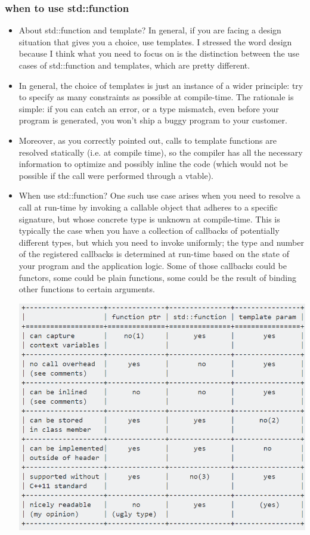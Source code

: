 \documentclass[a4paper,11pt,twoside]{book}
\begin{document}
\subsubsection{when to use std::function}
\begin{itemize}
	\item About std::function and template? In general, if you are facing a design situation that gives you a choice, use templates. I stressed the word design because I think what you need to focus on is the distinction between the use cases of std::function and templates, which are pretty different.
	
	\item In general, the choice of templates is just an instance of a wider principle: try to specify as many constraints as possible at compile-time. The rationale is simple: if you can catch an error, or a type mismatch, even before your program is generated, you won't ship a buggy program to your customer.
	
	\item Moreover, as you correctly pointed out, calls to template functions are resolved statically (i.e. at compile time), so the compiler has all the necessary information to optimize and possibly inline the code (which would not be possible if the call were performed through a vtable).
	
	
	\item When use std::function? One such use case arises when you need to resolve a call at run-time by invoking a callable object that adheres to a specific signature, but whose concrete type is unknown at compile-time. This is typically the case when you have a collection of callbacks of potentially different types, but which you need to invoke uniformly; the type and number of the registered callbacks is determined at run-time based on the state of your program and the application logic. Some of those callbacks could be functors, some could be plain functions, some could be the result of binding other functions to certain arguments.
	
	\includegraphics[scale=0.9]{pics/function.png} \newline
\end{itemize}
\end{document}
